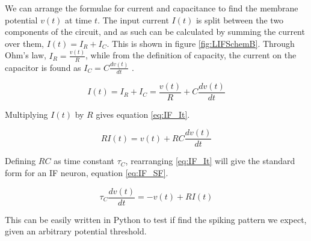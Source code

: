 We can arrange the formulae for current and capacitance to find the membrane
potential $v(t)$ at time $t$. The input current $I(t)$ is split between the two
components of the circuit, and as such can be calculated by summing the current
over them, $I(t) = I_R + I_C$. This is shown in figure \ref{fig:LIFSchemB}.
Through Ohm's law, $I_R = \frac{v(t)}{R}$, while from the definition of capacity,
the current on the capacitor is found as 
$I_C = C \frac{d v(t)}{d t}$ \autocite{gerstner_spiking_2002}. 
 
\begin{equation}\label{eq:IF_Itpre}
    I(t) = I_R + I_C = \frac{v(t)}{R} + C \frac{d v(t)}{d t}
\end{equation}

Multiplying $I(t)$
by $R$ gives equation \ref{eq:IF_It}.

\begin{equation}\label{eq:IF_It}
    R I(t) = v(t) + R C \frac{d v(t)}{d t}
\end{equation}

Defining $RC$ as time constant $\tau_C$, rearranging \ref{eq:IF_It} will
give the standard form for an IF neuron, equation \ref{eq:IF_SF}.

\begin{equation}\label{eq:IF_SF}
    \tau_C \frac{d v(t)}{d t} = - v(t) + R I(t)  
\end{equation}

This can be easily written in Python to test if find the spiking pattern we
expect, given an arbitrary potential threshold.


